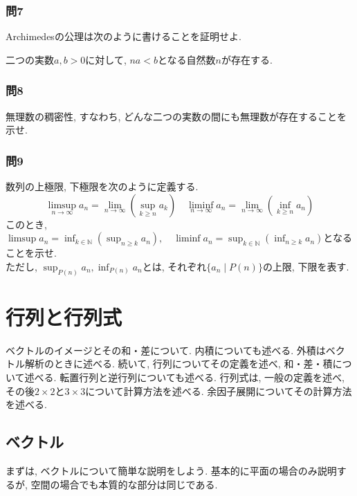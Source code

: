         \subsubsection*{問7}Archimedesの公理は次のように書けることを証明せよ.
        \begin{center}
            二つの実数$a,b>0$に対して, $na<b$となる自然数$n$が存在する.
        \end{center}

        \subsubsection*{問8}無理数の稠密性, すなわち, どんな二つの実数の間にも無理数が存在することを示せ.

        \subsubsection*{問9} 数列の上極限, 下極限を次のように定義する.
            \begin{equation}
                \limsup_{n\to\infty} a_n = \lim_{n\to\infty}\left(\sup_{k\geq n}a_k\right) \quad \liminf_{n\to\infty} a_n=\lim_{n\to\infty}\left(\inf_{k\geq n}a_n\right) \label{eq:集合論基礎:数列のlimsup,liminf}
            \end{equation}
            このとき, $\displaystyle\limsup a_n = \inf_{k\in\mathbb{N}}\left(\sup_{n\geq k}a_n\right),\quad \liminf a_n = \sup_{k\in\mathbb{N}}\left(\inf_{n\geq k}a_n\right)$となることを示せ.\\
            ただし, $\displaystyle \sup_{P(n)} a_n,\inf_{P(n)} a_n$とは, それぞれ$\{a_n\mid P(n)\}$の上限, 下限を表す.

\clearpage
\section{行列と行列式}
    ベクトルのイメージとその和・差について. 内積についても述べる. 外積はベクトル解析のときに述べる. 続いて, 行列についてその定義を述べ, 和・差・積について述べる.
    転置行列と逆行列についても述べる. 行列式は, 一般の定義を述べ, その後$2\times 2$と$3\times 3$について計算方法を述べる. 余因子展開についてその計算方法を述べる.
    \subsection{ベクトル}
        まずは, ベクトルについて簡単な説明をしよう. 基本的に平面の場合のみ説明するが, 空間の場合でも本質的な部分は同じである.

